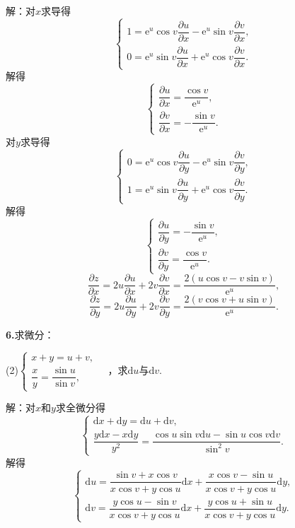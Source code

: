\documentclass[12pt, a4paper]{article}
\newcommand{\e}{\mathrm{e}}
\newcommand{\dif}{\mathrm{d}}
\begin{document}
解：对\(x\)求导得
\[\begin{cases}
1 = \e^u \cos v \dfrac{\partial u}{\partial x} - \e^u \sin v \dfrac{\partial v}{\partial x}, \\
0 = \e^u \sin v \dfrac{\partial u}{\partial x} + \e^u \cos v \dfrac{\partial v}{\partial x}.
\end{cases}\]
解得
\[\begin{cases}
\dfrac{\partial u}{\partial x} = \dfrac{\cos v}{\e^u}, \\
\dfrac{\partial v}{\partial x} = -\dfrac{\sin v}{\e^u}.
\end{cases}\]
对\(y\)求导得
\[\begin{cases}
0 = \e^u \cos v \dfrac{\partial u}{\partial y} - \e^u \sin v \dfrac{\partial v}{\partial y}, \\
1 = \e^u \sin v \dfrac{\partial u}{\partial y} + \e^u \cos v \dfrac{\partial v}{\partial y}.
\end{cases}\]
解得
\[\begin{cases}
\dfrac{\partial u}{\partial y} = -\dfrac{\sin v}{\e^u}, \\
\dfrac{\partial v}{\partial y} = \dfrac{\cos v}{\e^u}.
\end{cases}\]
\[\frac{\partial z}{\partial x} = 2u \dfrac{\partial u}{\partial x} + 2v \dfrac{\partial v}{\partial x} = \dfrac{2(u \cos v - v \sin v)}{\e^u},\]
\[\frac{\partial z}{\partial y} = 2u \dfrac{\partial u}{\partial y} + 2v \dfrac{\partial v}{\partial y} = \dfrac{2(v \cos v + u \sin v)}{\e^u}.\]

\textbf{6.}求微分：

(2)\(\begin{cases}
x + y = u + v, \\
\dfrac{x}{y} = \dfrac{\sin u}{\sin v},
\end{cases} \quad\)，求\(\dif u\)与\(\dif v\).

解：对\(x\)和\(y\)求全微分得
\[\begin{cases}
\dif x + \dif y = \dif u + \dif v, \\
\dfrac{y \dif x - x \dif y}{y^2} = \dfrac{\cos u \sin v \dif u - \sin u \cos v \dif v}{\sin^2 v}.
\end{cases}\]
解得
\[\begin{cases}
\dif u = \dfrac{\sin v + x \cos v}{x \cos v + y \cos u}\dif x + \dfrac{x \cos v - \sin u}{x \cos v + y \cos u}\dif y, \\
\dif v = \dfrac{y \cos u - \sin v}{x \cos v + y \cos u}\dif x + \dfrac{y \cos u + \sin u}{x \cos v + y \cos u}\dif y.
\end{cases}\]
\end{document}
